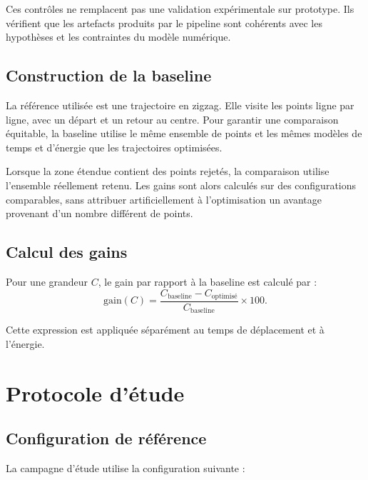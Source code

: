 Ces contrôles ne remplacent pas une validation expérimentale sur prototype. Ils vérifient que les artefacts produits par le pipeline sont cohérents avec les hypothèses et les contraintes du modèle numérique.

\subsection{Construction de la baseline}

La référence utilisée est une trajectoire en zigzag. Elle visite les points ligne par ligne, avec un départ et un retour au centre. Pour garantir une comparaison équitable, la baseline utilise le même ensemble de points et les mêmes modèles de temps et d'énergie que les trajectoires optimisées.

Lorsque la zone étendue contient des points rejetés, la comparaison utilise l'ensemble réellement retenu. Les gains sont alors calculés sur des configurations comparables, sans attribuer artificiellement à l'optimisation un avantage provenant d'un nombre différent de points.

\subsection{Calcul des gains}

Pour une grandeur $C$, le gain par rapport à la baseline est calculé par :
\begin{equation}
\mathrm{gain}(C)=\frac{C_{\mathrm{baseline}}-C_{\mathrm{optimisé}}}{C_{\mathrm{baseline}}}\times100.
\label{eq:gain_tandem}
\end{equation}

Cette expression est appliquée séparément au temps de déplacement et à l'énergie.

\section{Protocole d'étude}
\label{sec:protocole_etude}

\subsection{Configuration de référence}

La campagne d'étude utilise la configuration suivante :

